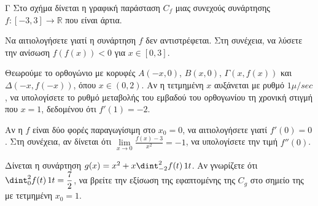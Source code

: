 \begin{thema}{Γ}
Στο σχήμα δίνεται η γραφική παράσταση $C_f$ μιας συνεχούς συνάρτησης $f:[-3, 3]\to\mathbb{R}$ που είναι {άρτια}.

\begin{center}
\end{center}

\begin{erwthma}
  \item Να αιτιολογήσετε γιατί η συνάρτηση $f$ δεν αντιστρέφεται. Στη συνέχεια, να λύσετε την ανίσωση $f(f(x)) < 0$ για $x \in [0, 3]$.
  \item Θεωρούμε το ορθογώνιο με κορυφές $A(-x, 0)$, $B(x, 0)$, $\Gamma(x, f(x))$ και $\Delta(-x, f(-x))$, όπου $x \in (0, 2)$. Αν η τετμημένη $x$ αυξάνεται με ρυθμό $1 \mu/\si{sec}$, να υπολογίσετε το ρυθμό μεταβολής του εμβαδού του ορθογωνίου τη χρονική στιγμή που $x = 1$, δεδομένου ότι $f'(1) = -2$.
  \item Αν η $f$ είναι δύο φορές παραγωγίσιμη στο $x_0=0$, να αιτιολογήσετε γιατί $f'(0) = 0$. Στη συνέχεια, αν δίνεται ότι $\lim\limits_{x \to 0} \frac{f(x) - 3}{x^2} = -1$, να υπολογίσετε την τιμή $f''(0)$.
  \item Δίνεται η συνάρτηση $g(x) = x^2 + x \dint_{-2}^2 f(t)\,\d t$. Αν γνωρίζετε ότι $\dint_0^2 f(t)\,\d t = \dfrac{7}{2}$, να βρείτε την εξίσωση της εφαπτομένης της $C_g$ στο σημείο της με τετμημένη $x_0 = 1$.
\end{erwthma}
\end{thema}



